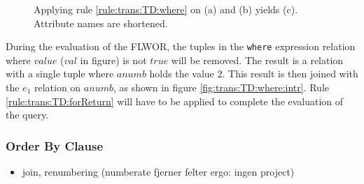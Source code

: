 \begin{myExample}
\begin{figure}[h]
\caption[Example: Evaluation of where clause]{Applying rule \ref{rule:trans:TD:where} on (a) and (b)
yields (c). Attribute names are shortened. \label{fig:trans:TD:whereClause}}
\end{figure}
During the evaluation of the FLWOR, the tuples in the \texttt{where} expression relation where $value$ ($val$ in
figure) is not $true$ will be removed. The result is a relation with a single tuple where $anumb$ holds the value
$2$. This result is then joined with the $e_1$ relation on $anumb$, as shown in figure
\ref{fig:trans:TD:where:intr}. Rule \ref{rule:trans:TD:forReturn} will have to be applied to complete the
evaluation of the query.
\end{myExample}


\subsubsection{Order By Clause}
\begin{itemize}
  \item join, renumbering (numberate fjerner felter ergo: ingen project)
\end{itemize}

